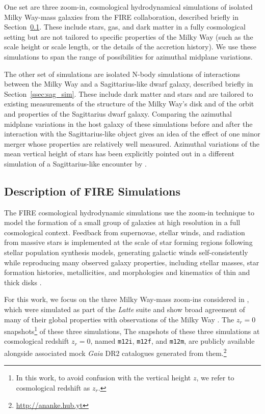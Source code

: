 \documentclass[twocolumn]{aastex62}
\newcommand{\mi}{\texttt{m12i}}
\newcommand{\mf}{\texttt{m12f}}
\newcommand{\mm}{\texttt{m12m}}
\newcommand{\z}{z_r}
\begin{document}
One set are three zoom-in, cosmological hydrodynamical simulations of isolated Milky Way-mass galaxies from the FIRE collaboration, described briefly in Section~\ref{ssec:cosmozoom}. These include stars, gas, and dark matter in a fully cosmological setting but are not tailored to specific properties of the Milky Way (such as the scale height or scale length, or the details of the accretion history). We use these simulations to span the range of possibilities for azimuthal midplane variations.

The other set of simulations are isolated N-body simulations of interactions between the Milky Way and a Sagittarius-like dwarf galaxy, described briefly in Section~\ref{ssec:sag_sim}. These include dark matter and stars and are tailored to existing measurements of the structure of the Milky Way's disk and of the orbit and properties of the Sagittarius dwarf galaxy. Comparing the azimuthal midplane variations in the host galaxy of these simulations before and after the interaction with the Sagittarius-like object gives an idea of the effect of one minor merger whose properties are relatively well measured. Azimuthal variations of the mean vertical height of stars has been explicitly pointed out in a different simulation of a Sagittarius-like encounter by \citet{2013MNRAS.429..159G}.

\subsection{Description of FIRE Simulations} \label{ssec:cosmozoom}
The FIRE cosmological hydrodynamic simulations
\citep{2014MNRAS.445..581H,2018MNRAS.480..800H} use the zoom-in technique
\citep[e.g.,][]{1993ApJ...412..455K,2014MNRAS.437.1894O} to model the formation
of a small group of galaxies at high resolution in a full cosmological
context. Feedback from supernovae, stellar winds, and radiation from massive
stars is implemented at the scale of star forming regions following stellar
population synthesis models, generating galactic winds self-consistently
\citep{2015MNRAS.454.2691M, 2017MNRAS.470.4698A} while reproducing many
observed galaxy properties, including stellar masses, star formation
histories, metallicities, and morphologies and kinematics of thin and thick
disks \citep{2014MNRAS.445..581H, 2016MNRAS.456.2140M, 2017MNRAS.467.2430M,
2016ApJ...827L..23W, 2018MNRAS.481.4133G, 2018MNRAS.480..800H}.

For this work,
we focus on the three Milky Way-mass zoom-ins considered in
\citet{2018arXiv180610564S}, which were simulated as part of the
\textit{Latte} suite and show broad agreement of many of their global
properties with observations of the Milky Way \citep{2016ApJ...827L..23W,
2018MNRAS.481.4133G}. The 
$\z = 0$ snapshots\footnote{In this work, to avoid
confusion with the vertical height $z$, we refer to cosmological redshift as
$\z$.} of these three simulations, 
The snapshots of these three simulations at cosmological redshift $\z = 0$,
named \mi{}, \mf{}, and \mm{},
are publicly available alongside associated mock \textit{Gaia} DR2
catalogues generated from them.\footnote{\url{http://ananke.hub.yt}}
\end{document}
